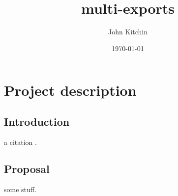 \documentclass[12pt]{article}
\author{John Kitchin}
\date{\today}
\title{multi-exports}
\begin{document}
\section{Project description}
\label{sec-1}
\subsection{Introduction}
\label{sec-1-1}
a citation \cite{mehta-2014-ident-poten}.

\subsection{Proposal}
\label{sec-1-2}
some stuff.

\newpage

{\vbox{}}
\end{document}
